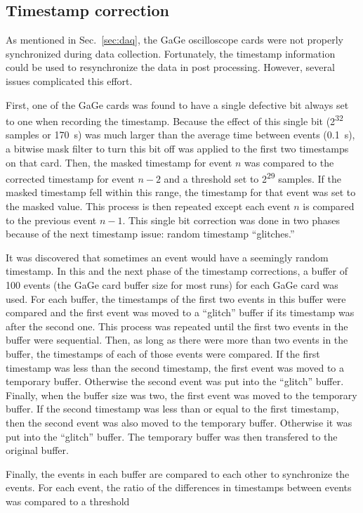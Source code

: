 \documentclass[oneside,12pt]{memoir}
\begin{document}
\subsection{Timestamp correction}
\label{sec:timestamp}
As mentioned in Sec.~\ref{sec:daq}, the GaGe oscilloscope cards were not properly synchronized during data collection. Fortunately, the timestamp information could be used to resynchronize the data in post processing. However, several issues complicated this effort.\par
First, one of the GaGe cards was found to have a single defective bit always set to one when recording the timestamp. Because the effect of this single bit (2\textsuperscript{32} samples or 170~s) was much larger than the average time between events (0.1~s), a bitwise mask filter to turn this bit off was applied to the first two timestamps on that card. Then, the masked timestamp for event $n$ was compared to the corrected timestamp for event $n-2$ and a threshold set to 2\textsuperscript{29} samples. If the masked timestamp fell within this range, the timestamp for that event was set to the masked value. This process is then repeated except each event $n$ is compared to the previous event $n-1$. This single bit correction was done in two phases because of the next timestamp issue: random timestamp ``glitches.''\par
It was discovered that sometimes an event would have a seemingly random timestamp. In this and the next phase of the timestamp corrections, a buffer of 100 events (the GaGe card buffer size for most runs) for each GaGe card was used. For each buffer, the timestamps of the first two events in this buffer were compared and the first event was moved to a ``glitch'' buffer if its timestamp was after the second one. This process was repeated until the first two events in the buffer were sequential. Then, as long as there were more than two events in the buffer, the timestamps of each of those events were compared. If the first timestamp was less than the second timestamp, the first event was moved to a temporary buffer. Otherwise the second event was put into the ``glitch'' buffer. Finally, when the buffer size was two, the first event was moved to the temporary buffer. If the second timestamp was less than or equal to the first timestamp, then the second event was also moved to the temporary buffer. Otherwise it was put into the ``glitch'' buffer. The temporary buffer was then transfered to the original buffer.\par
Finally, the events in each buffer are compared to each other to synchronize the events. For each event, the ratio of the differences in timestamps between events was compared to a threshold
\end{document}
